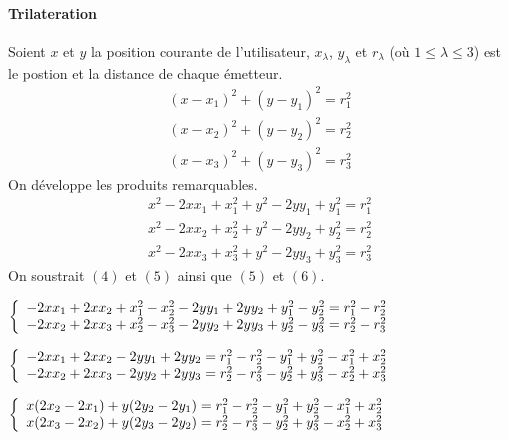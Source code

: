 \documentclass[11pt,a4paper]{article}
\begin{document}
    \paragraph{Trilateration}
      Soient $x$ et $y$ la position courante de l'utilisateur, $x_{\lambda}$, $y_{\lambda}$ et $r_{\lambda}$ (où $1 \leq \lambda \leq 3$) est le postion et la distance de chaque émetteur.
      \begin{align}
        (x-x_{1})^{2}+(y-y_{1})^{2} = r_{1}^{2} \\
        (x-x_{2})^{2}+(y-y_{2})^{2} = r_{2}^{2} \\
        (x-x_{3})^{2}+(y-y_{3})^{2} = r_{3}^{2}
      \end{align}
      On développe les produits remarquables.
      \begin{align}
        x^{2}-2xx_{1}+x_{1}^{2}+y^{2}-2yy_{1}+y_{1}^{2} = r_{1}^{2} \\
        x^{2}-2xx_{2}+x_{2}^{2}+y^{2}-2yy_{2}+y_{2}^{2} = r_{2}^{2} \\
        x^{2}-2xx_{3}+x_{3}^{2}+y^{2}-2yy_{3}+y_{3}^{2} = r_{3}^{2}
      \end{align}
      On soustrait $(4)$ et $(5)$ ainsi que $(5)$ et $(6)$.
      \begin{center}
        $\left \{
        \begin{array}{c c}
          -2xx_{1}+2xx_{2}+x_{1}^{2}-x_{2}^{2}-2yy_{1}+2yy_{2}+y_{1}^{2}-y_{2}^{2} = r_{1}^{2}-r_{2}^{2} \\
          -2xx_{2}+2xx_{3}+x_{2}^{2}-x_{3}^{2}-2yy_{2}+2yy_{3}+y_{2}^{2}-y_{3}^{2} = r_{2}^{2}-r_{3}^{2}
        \end{array}
        \right.$
      \end{center}
      \begin{center}
        $\left \{
        \begin{array}{c c}
          -2xx_{1}+2xx_{2}-2yy_{1}+2yy_{2} = r_{1}^{2}-r_{2}^{2}-y_{1}^{2}+y_{2}^{2}-x_{1}^{2}+x_{2}^{2} \\
          -2xx_{2}+2xx_{3}-2yy_{2}+2yy_{3} = r_{2}^{2}-r_{3}^{2}-y_{2}^{2}+y_{3}^{2}-x_{2}^{2}+x_{3}^{2}
        \end{array}
        \right.$
      \end{center}
      \begin{center}
        $\left \{
        \begin{array}{c c}
          x(2x_{2}-2x_{1})+y(2y_{2}-2y_{1}) = r_{1}^{2}-r_{2}^{2}-y_{1}^{2}+y_{2}^{2}-x_{1}^{2}+x_{2}^{2} \\
          x(2x_{3}-2x_{2})+y(2y_{3}-2y_{2}) = r_{2}^{2}-r_{3}^{2}-y_{2}^{2}+y_{3}^{2}-x_{2}^{2}+x_{3}^{2}
        \end{array}
        \right.$
      \end{center}
\end{document}

